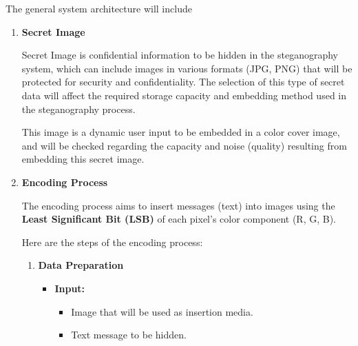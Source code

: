 \documentclass{ittelkom}
\begin{document}


The general system architecture will include

\begin{enumerate}
    \item \textbf{Secret Image}

          Secret Image is confidential information to be hidden in the steganography
          system, which can include images in various formats (JPG, PNG) that will be
          protected for security and confidentiality. The selection of this type of
          secret data will affect the required storage capacity and embedding method used
          in the steganography process.

          This image is a dynamic user input to be embedded in a color cover image, and
          will be checked regarding the capacity and noise (quality) resulting from
          embedding this secret image.

    \item \textbf{Encoding Process}

          The encoding process aims to insert messages (text) into images using the
          \textbf{Least Significant Bit (LSB)} of each pixel's color component (R, G, B).

          Here are the steps of the encoding process:

          \begin{enumerate}
              \item \textbf{Data Preparation}

                    \begin{itemize}
                        \item \textbf{Input:}
                              \begin{itemize}
                                  \item Image that will be used as insertion media.
                                  \item Text message to be hidden.
                              \end{itemize}


\end{itemize}
\end{enumerate}
\end{enumerate}
\end{document}
